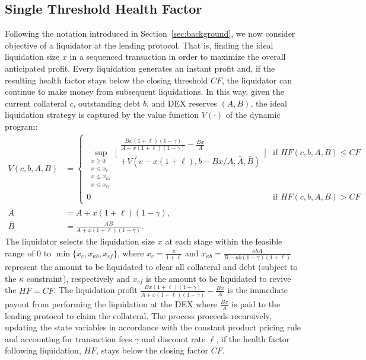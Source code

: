 \documentclass[11pt]{article} %
\begin{document}
\subsection{Single Threshold Health Factor}\label{sec:optimiz-single}
Following the notation introduced in Section~\ref{sec:background}, we now consider objective of a liquidator at the lending protocol. 
That is, finding the ideal liquidation size $x$ in a sequenced transaction in order to maximize the overall anticipated profit. Every liquidation generates an instant profit and, if the resulting health factor stays below the closing threshold $CF$, the liquidator can continue to make money from subsequent liquidations. In this way, given the current collateral $c$, outstanding debt $b$, and DEX reserves $(A,B)$, the ideal liquidation strategy is captured by the value function $V(\cdot)$ of the dynamic program:
\begin{align}
\label{eq:V} V(c,b,A,B) &= \begin{cases} \underset{\substack{x \geq 0 \\ x \leq x_c \\ x \leq x_{\kappa b} \\ x \leq x_{cf}}}{\sup} \Bigg[\begin{array}{l} \frac{Bx(1+\ell)(1-\gamma)}{A+x(1+\ell)(1-\gamma)}-\frac{Bx}{A} \\ + V(c-x(1+\ell),b-Bx/A,\bar{A},\bar{B})\end{array}\Bigg] & \text{if } HF(c,b,A,B) \leq CF \\ 0 & \text{if } HF(c,b,A,B) > CF  \end{cases}\\
\nonumber \bar{A} &= A+x(1+\ell)(1-\gamma), \\
\nonumber \bar{B} &= \frac{AB}{A+x(1+\ell)(1-\gamma)}.
\end{align} 
The liquidator selects the liquidation size $x$ at each stage within the feasible range of $0$ to $\min\{x_c,x_{\kappa b}, x_{cf}\}$, where $x_c = \frac{c}{1+\ell}$ and $x_{\kappa b} = \frac{\kappa bA}{B-\kappa b(1-\gamma)(1+\ell)}$ represent the amount to be liquidated to clear all collateral and debt (subject to the $\kappa$ constraint), respectively and $x_{cf}$ is the amount to be liquidated to revive the $HF=CF$. The liquidation profit $\frac{Bx(1+\ell)(1-\gamma)}{A+x(1+\ell)(1-\gamma)}-\frac{Bx}{A}$ is the immediate payout from performing the liquidation at the DEX where $\frac{Bx}{A}$ is paid to the lending protocol to claim the collateral. The process proceeds recursively, updating the state variables in accordance with the constant product pricing rule and accounting for transaction fees $\gamma$ and discount rate $\ell$, if the health factor following liquidation, $HF$, stays below the closing factor $CF$.
\end{document}
